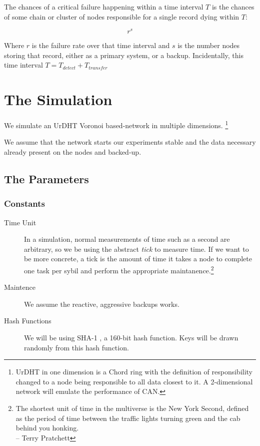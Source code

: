 The chances of a critical failure happening within a time interval $ T $ is the chances of some chain or cluster of nodes responsible for a single record dying within $ T $:

$$r^{s}$$

Where $ r $ is the failure rate over that time interval and $s$ is the number nodes storing that record, either as a primary system, or a backup.
Incidentally, this time interval $T = T_{detect} + T_{transfer} $


\section{The Simulation}

We simulate an UrDHT Voronoi based-network in multiple dimensions. \footnote{UrDHT in one dimension is a Chord ring with the definition of responsibility changed to a node being responsible to all data closest to it. A 2-dimensional network will emulate the performance of CAN.}

We assume that the network starts our experiments stable and the data necessary already present on the nodes and backed-up.

\subsection{The Parameters}

\subsubsection{Constants}

\begin{description}
	\item [Time Unit] In a simulation, normal measurements of time such as a second are arbitrary, so we be using the abstract \textit{tick} to measure time.  
	If we want to be more concrete, a tick is the amount of time it takes a node to complete one task per sybil and perform the appropriate maintanence.\footnote{The shortest unit of time in the multiverse is the New York Second, defined as the period of time between the traffic lights turning green and the cab behind you honking.\\-- Terry Pratchett}
	\item [Maintence] We assume the reactive, aggressive backups works.
	\item [Hash Functions] We will be using SHA-1 \cite{sha1}, a 160-bit hash function.  
	Keys will be drawn randomly from this hash function.
\end{description}

